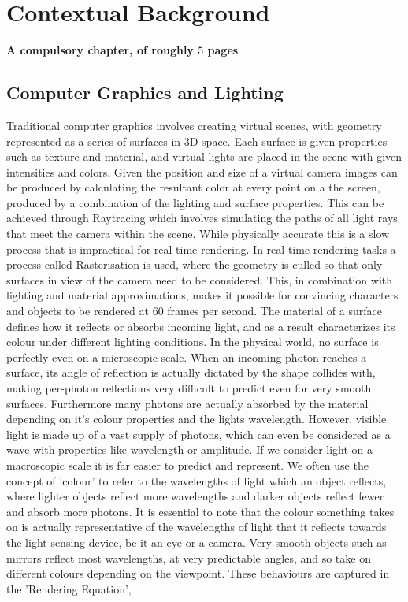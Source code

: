 \documentclass[ %
                    author={Gavin Parker},
                supervisor={Dr. Neill Campbell},
                    degree={MEng},
                     title={Deep Siamese Networks for Illumination Estimation from Stereo Images},
                  subtitle={},
                      type={research},
                      year={2018} ]{dissertation}
\begin{document}
\mainmatter


\chapter{Contextual Background}
\label{chap:context}

{\bf A compulsory chapter,     of roughly $5$ pages}
\vspace{1cm} 
\section{Computer Graphics and Lighting}

\noindent
Traditional computer graphics involves creating virtual scenes, with geometry represented as a series of surfaces in 3D space. Each surface is given properties such as texture and material, and virtual lights are placed in the scene with given intensities and colors. Given the position and size of a virtual camera images can be produced by calculating the resultant color at every point on a the screen, produced by a combination of the lighting and surface properties. This can be achieved through Raytracing which involves simulating the paths of all light rays that meet the camera within the scene. While physically accurate this is a slow process that is impractical for real-time rendering. In real-time rendering tasks a process called Rasterisation is used, where the geometry is culled so that only surfaces in view of the camera need to be considered. This, in combination with lighting and material approximations, makes it possible for convincing characters and objects to be rendered at 60 frames per second.
\newline
{}
The material of a surface defines how it reflects or absorbs incoming light, and as a result characterizes its colour under different lighting conditions. In the physical world, no surface is perfectly even on a microscopic scale. When an incoming photon reaches a surface, its angle of reflection is actually dictated by the shape collides with, making per-photon reflections very difficult to predict even for very smooth surfaces. Furthermore many photons are actually absorbed by the material depending on it's colour properties and the lights wavelength. However, visible light is made up of a vast supply of photons, which can even be considered as a wave with properties like wavelength or amplitude. If we consider light on a macroscopic scale it is far easier to predict and represent. We often use the concept of 'colour' to refer to the wavelengths of light which an object reflects, where lighter objects reflect more wavelengths and darker objects reflect fewer and absorb more photons. It is essential to note that the colour something takes on is actually representative of the wavelengths of light that it reflects towards the light sensing device, be it an eye or a camera. Very smooth objects such as mirrors reflect most wavelengths, at very predictable angles, and so take on different colours depending on the viewpoint. These behaviours are captured in the 'Rendering Equation', 
\end{document}
